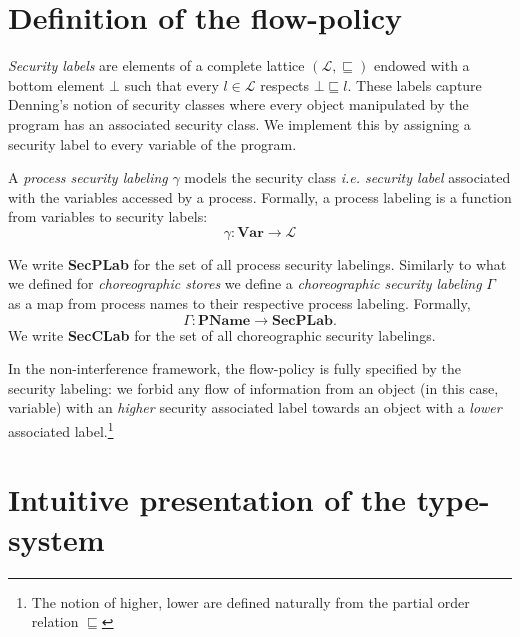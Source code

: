 \documentclass[12pt,a4paper,twoside]{book}
\begin{document}
\section{Definition of the flow-policy}
\label{type:flow-policy}
\textit{Security labels} are elements of a complete lattice $(\mathscr{L}, \sqsubseteq)$ endowed with a bottom element $\bot$ such that every $l \in \mathscr{L}$ respects $\bot \sqsubseteq l$.
These labels capture Denning's notion of security classes where every object manipulated by the program has an associated security class. We implement this by assigning a security label to every variable of the program.

A \textit{process security labeling} $\gamma$ models the security class \textit{i.e. security label} associated with the variables accessed by a process. Formally, a process labeling is a function from variables to security labels:
\[
	\gamma : \textbf{Var} \longrightarrow \mathscr{L}
\]

We write \textbf{SecPLab} for the set of all process security labelings.
Similarly to what we defined for \textit{choreographic stores} we define a \textit{choreographic security labeling} $\Gamma$ as a map from process names to their respective process labeling. Formally,
\[
\Gamma : \textbf{PName} \longrightarrow \textbf{SecPLab}.
\]
We write \textbf{SecCLab} for the set of all choreographic security labelings.

In the non-interference framework, the flow-policy is fully specified by the security labeling: we forbid any flow of information from an object (in this case, variable) with an \textit{higher} security associated label towards an object with a \textit{lower} associated label.\footnote{The notion of higher, lower are defined naturally from the partial order relation $\sqsubseteq$}

\section{Intuitive presentation of the type-system}
\label{type:intuitive}
\end{document}
